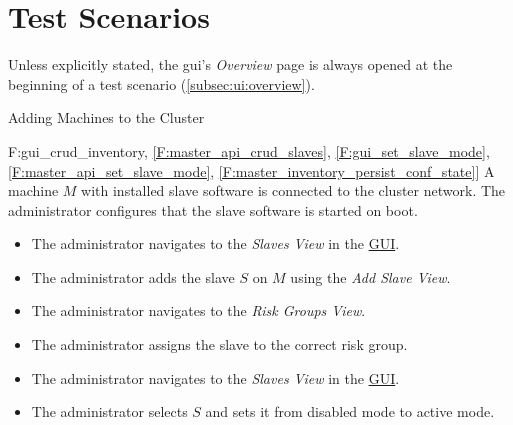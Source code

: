 \documentclass[a4paper, 11pt]{article}
\makeatletter
\def\namedlabel#1#2{\begingroup
    #2%
    \def\@currentlabel{#2}%
    \phantomsection\label{#1}\endgroup
}
\newcommand{\oitem}[2]{
  \@ifundefined{c@oitem#1}{\newcounter{oitem#1}}{} %
  \addtocounter{oitem#1}{10}
  \item[\namedlabel{#1:#2}{/#1\arabic{oitem#1}/}]
}
\newcommand{\testsequence}[3][]{
	\begin{description}[leftmargin=!,labelwidth=\widthof{\bfseries Preconditions}]
		\ifthenelse{\equal{#1}{}}
		{} %
		{\item[Tests] #1}
		\item[Preconditions] #2
		\item[Steps] #3
	\end{description}
}
\let\oldsection\section
\renewcommand\section{\clearpage\oldsection}
\makeatother
\begin{document}



\section{Test Scenarios}
Unless explicitly stated, the \acrshort{gui}'s \textit{Overview} page is always opened at the beginning of a test scenario (\ref{subsec:ui:overview}).

\begin{description}

\oitem{TS}{} Adding Machines to the Cluster
\testsequence
[\ref{F:gui_crud_inventory}, \ref{F:master_api_crud_slaves}, \ref{F:gui_set_slave_mode}, \ref{F:master_api_set_slave_mode}, \ref{F:master_inventory_persist_conf_state}]
{
	A machine $M$ with installed \gls{slave} software is connected to the \gls{cluster} network. The \gls{administrator} configures that the \gls{slave} software is started on boot.
}
{
	\begin{itemize}
		\item The \gls{administrator} navigates to the \textit{Slaves View} in the \hyperref[SM:GUI]{GUI}.
		\item The \gls{administrator} adds the slave $S$ on $M$ using the \textit{Add Slave View}.
		\item The \gls{administrator} navigates to the \textit{Risk Groups View}.
		\item The \gls{administrator} assigns the slave to the correct risk group.
		\item The \gls{administrator} navigates to the \textit{Slaves View} in the \hyperref[SM:GUI]{GUI}.
		\item The \gls{administrator} selects $S$ and sets it from \gls{disabled mode} to \gls{active mode}.
	\end{itemize}
}


\end{description}
\end{document}

